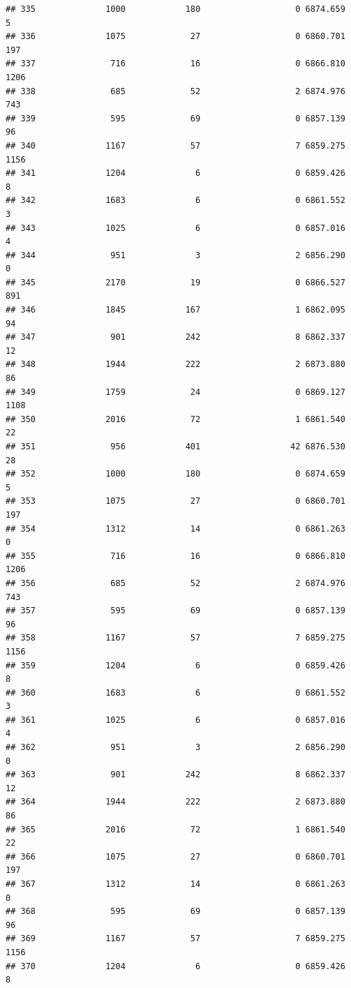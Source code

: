\documentclass[
]{article}
\begin{document}
\begin{verbatim}
## 335              1000            180                   0 6874.659    5
## 336              1075             27                   0 6860.701  197
## 337               716             16                   0 6866.810 1206
## 338               685             52                   2 6874.976  743
## 339               595             69                   0 6857.139   96
## 340              1167             57                   7 6859.275 1156
## 341              1204              6                   0 6859.426    8
## 342              1683              6                   0 6861.552    3
## 343              1025              6                   0 6857.016    4
## 344               951              3                   2 6856.290    0
## 345              2170             19                   0 6866.527  891
## 346              1845            167                   1 6862.095   94
## 347               901            242                   8 6862.337   12
## 348              1944            222                   2 6873.880   86
## 349              1759             24                   0 6869.127 1108
## 350              2016             72                   1 6861.540   22
## 351               956            401                  42 6876.530   28
## 352              1000            180                   0 6874.659    5
## 353              1075             27                   0 6860.701  197
## 354              1312             14                   0 6861.263    0
## 355               716             16                   0 6866.810 1206
## 356               685             52                   2 6874.976  743
## 357               595             69                   0 6857.139   96
## 358              1167             57                   7 6859.275 1156
## 359              1204              6                   0 6859.426    8
## 360              1683              6                   0 6861.552    3
## 361              1025              6                   0 6857.016    4
## 362               951              3                   2 6856.290    0
## 363               901            242                   8 6862.337   12
## 364              1944            222                   2 6873.880   86
## 365              2016             72                   1 6861.540   22
## 366              1075             27                   0 6860.701  197
## 367              1312             14                   0 6861.263    0
## 368               595             69                   0 6857.139   96
## 369              1167             57                   7 6859.275 1156
## 370              1204              6                   0 6859.426    8

\end{verbatim}
\end{document}
